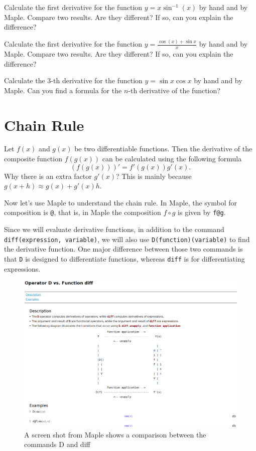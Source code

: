 \documentclass[]{book}
\theoremstyle{definition}
\theoremstyle{definition}
\theoremstyle{definition}
\theoremstyle{remark}
\let\BeginKnitrBlock\begin \let\EndKnitrBlock\end
\begin{document}
\BeginKnitrBlock{exercise}
\protect\hypertarget{exr:unnamed-chunk-11}{}{\label{exr:unnamed-chunk-11} }
Calculate the first derivative for the function \(y=x\sin^{-1}(x)\) by hand and by Maple. Compare two results. Are they different? If so, can you explain the difference?
\EndKnitrBlock{exercise}

\BeginKnitrBlock{exercise}
\protect\hypertarget{exr:unnamed-chunk-12}{}{\label{exr:unnamed-chunk-12} }
Calculate the first derivative for the function \(y=\frac{\cos(x)+\sin x}{x}\) by hand and by Maple. Compare two results. Are they different? If so, can you explain the difference?
\EndKnitrBlock{exercise}

\BeginKnitrBlock{exercise}
\protect\hypertarget{exr:unnamed-chunk-13}{}{\label{exr:unnamed-chunk-13} }
Calculate the \(3\)-th derivative for the function \(y=\sin x\cos x\) by hand and by Maple. Can you find a formula for the \(n\)-th derivative of the function?
\EndKnitrBlock{exercise}

\hypertarget{chain-rule}{%
\section{Chain Rule}\label{chain-rule}}

Let \(f(x)\) and \(g(x)\) be two differentiable functions. Then the derivative of the composite function \(f(g(x))\) can be calculated using the following formula
\[
(f(g(x)))'=f'(g(x))g'(x).
\]
Why there is an extra factor \(g'(x)\)? This is mainly because \(g(x+h)\approx g(x)+g'(x)h\).

Now let's use Maple to understand the chain rule. In Maple, the symbol for composition is \texttt{@}, that is, in Maple the composition \(f\circ g\) is given by \texttt{f@g}.

Since we will evaluate derivative functions, in addition to the command \texttt{diff(expression,\ variable)}, we will also use \texttt{D(function)(variable)} to find the derivative function. One major difference between those two commands is that \texttt{D} is designed to differentiate functions, whereas \texttt{diff} is for differentiating expressions.

\begin{figure}
\centering
\includegraphics{figs/D_vs_diff.png}
\caption{A screen shot from Maple shows a comparison between the commands D and diff}
\end{figure}
\end{document}
